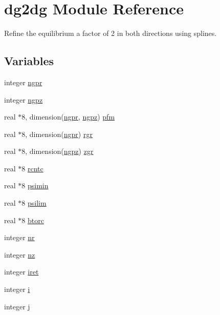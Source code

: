 \hypertarget{namespacedg2dg}{
\section{dg2dg Module Reference}
\label{namespacedg2dg}
}
Refine the equilibrium a factor of 2 in both directions using splines.  


\subsection*{Variables}
\begin{CompactItemize}
\item 
integer \hyperlink{namespacedg2dg_e9a7ecb72eab0642c64a97ca91c13b0a}{ngpr}
\item 
integer \hyperlink{namespacedg2dg_e7dd506213bbb6cba705ecab71df0a94}{ngpz}
\item 
real $\ast$8, dimension(\hyperlink{namespacedg2dg_e9a7ecb72eab0642c64a97ca91c13b0a}{ngpr}, \hyperlink{namespacedg2dg_e7dd506213bbb6cba705ecab71df0a94}{ngpz}) \hyperlink{namespacedg2dg_401e9ba4eb2cfdba5f316ce35f5d2dd4}{pfm}
\item 
real $\ast$8, dimension(\hyperlink{namespacedg2dg_e9a7ecb72eab0642c64a97ca91c13b0a}{ngpr}) \hyperlink{namespacedg2dg_f36a00895bcd828127ea8f8a115978ce}{rgr}
\item 
real $\ast$8, dimension(\hyperlink{namespacedg2dg_e7dd506213bbb6cba705ecab71df0a94}{ngpz}) \hyperlink{namespacedg2dg_35685ffad7953d2a38165725ba540d49}{zgr}
\item 
real $\ast$8 \hyperlink{namespacedg2dg_19f3394ca4f1ef71cd6de32f9d199b7b}{rcntc}
\item 
real $\ast$8 \hyperlink{namespacedg2dg_b51d79dfb19c6827c5e2540a7f283f23}{psimin}
\item 
real $\ast$8 \hyperlink{namespacedg2dg_5abf8e2b92fc98dcb269d20099028451}{psilim}
\item 
real $\ast$8 \hyperlink{namespacedg2dg_86019e86ab8b07942741fe80210d5a93}{btorc}
\item 
integer \hyperlink{namespacedg2dg_b3df22b96364892fd08e20a2d00bc877}{nr}
\item 
integer \hyperlink{namespacedg2dg_d946d8fc014faceab571c2af730bc414}{nz}
\item 
integer \hyperlink{namespacedg2dg_ded4078812d7ca1eda5041303ad4cf55}{iret}
\item 
integer \hyperlink{namespacedg2dg_4c909ba87dbff09a900fd0ad334a474a}{i}
\item 
integer \hyperlink{namespacedg2dg_3712f36ad01bfd23258b66f4b9fdaa5b}{j}
\end{CompactItemize}


